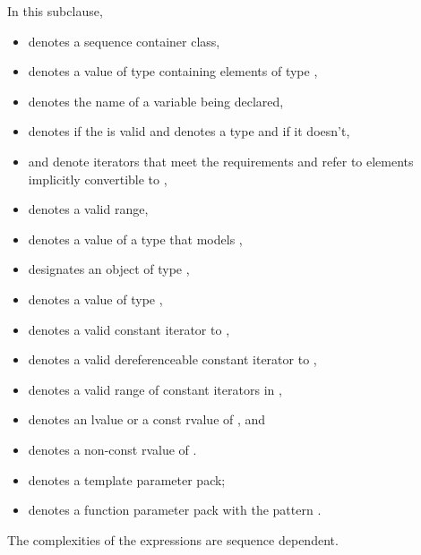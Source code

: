 \pnum
In this subclause,
\begin{itemize}
\item
{} denotes a sequence container class,
\item
{} denotes a value of type  containing elements of type ,
\item
{} denotes the name of a variable being declared,
\item
{} denotes  if
the   is valid and denotes a
type and
 if it doesn't,
\item
{} and 
denote iterators that meet the  requirements
and refer to elements implicitly convertible to ,
\item
{} denotes a valid range,
\item
{} denotes a value of a type 
that models ,
\item
{} designates an object of type ,
\item
{} denotes a value of type ,
\item
{} denotes a valid constant iterator to ,
\item
{} denotes a valid dereferenceable constant iterator to ,
\item
{} denotes a valid range of constant iterators in ,
\item
{} denotes an lvalue or a const rvalue of , and
\item
{} denotes a non-const rvalue of .
\item
{} denotes a template parameter pack;
\item
{} denotes a function parameter pack with the pattern .
\end{itemize}

\pnum
The complexities of the expressions are sequence dependent.

\renewcommand{\indexcont}[1]{%
\indexlibrarymisc{\idxcode{#1}}{sequence containers}%
\indexlibrarymemberx{deque}{#1}%
\indexlibrarymemberx{forward_list}{#1}%
\indexlibrarymemberx{list}{#1}%
\indexlibrarymemberx{vector}{#1}%
\indexlibrarymemberx{inplace_vector}{#1}%
}

